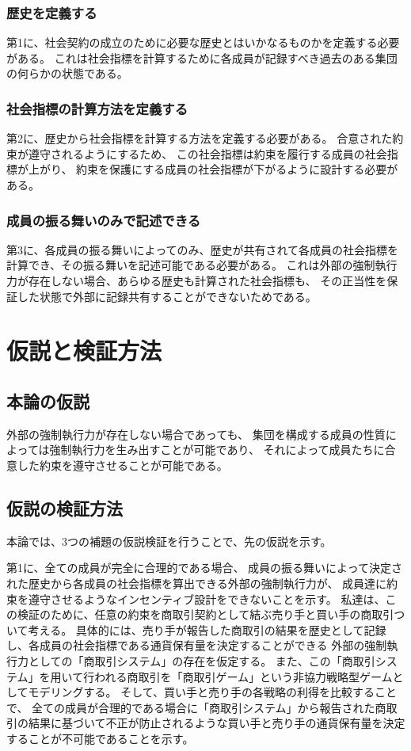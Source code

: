 \documentclass[a4j]{ujreport}
\begin{document}
\subsection{歴史を定義する}
第1に、社会契約の成立のために必要な歴史とはいかなるものかを定義する必要がある。
これは社会指標を計算するために各成員が記録すべき過去のある集団の何らかの状態である。


\subsection{社会指標の計算方法を定義する}
第2に、歴史から社会指標を計算する方法を定義する必要がある。\cite{simon:1947}
合意された約束が遵守されるようにするため、
この社会指標は約束を履行する成員の社会指標が上がり、
約束を保護にする成員の社会指標が下がるように設計する必要がある。


\subsection{成員の振る舞いのみで記述できる}
第3に、各成員の振る舞いによってのみ、歴史が共有されて各成員の社会指標を計算でき、その振る舞いを記述可能である必要がある。
これは外部の強制執行力が存在しない場合、あらゆる歴史も計算された社会指標も、
その正当性を保証した状態で外部に記録共有することができないためである。


\chapter{仮説と検証方法}
\section{本論の仮説}
外部の強制執行力が存在しない場合であっても、
集団を構成する成員の性質によっては強制執行力を生み出すことが可能であり、
それによって成員たちに合意した約束を遵守させることが可能である。


\section{仮説の検証方法}
本論では、3つの補題の仮説検証を行うことで、先の仮説を示す。

第1に、全ての成員が完全に合理的である場合、
成員の振る舞いによって決定された歴史から各成員の社会指標を算出できる外部の強制執行力が、
成員達に約束を遵守させるようなインセンティブ設計をできないことを示す。
私達は、この検証のために、任意の約束を商取引契約として結ぶ売り手と買い手の商取引ついて考える。
具体的には、売り手が報告した商取引の結果を歴史として記録し、各成員の社会指標である通貨保有量を決定することができる
外部の強制執行力としての「商取引システム」の存在を仮定する。
また、この「商取引システム」を用いて行われる商取引を「商取引ゲーム」という非協力戦略型ゲームとしてモデリングする。
そして、買い手と売り手の各戦略の利得を比較することで、
全ての成員が合理的である場合に「商取引システム」から報告された商取引の結果に基づいて不正が防止されるような買い手と売り手の通貨保有量を決定することが不可能であることを示す。
\end{document}
